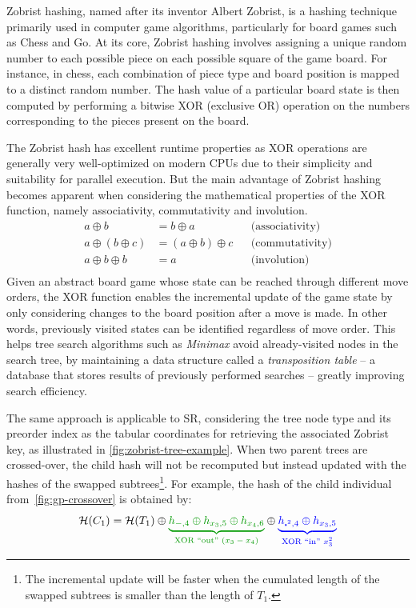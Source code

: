 \documentclass[openacc]{rstransa}%
\begin{document}
Zobrist hashing, named after its inventor Albert Zobrist, is a hashing technique primarily used in computer game algorithms, particularly for board games such as Chess and Go.
%
At its core, Zobrist hashing involves assigning a unique random number to each possible piece on each possible square of the game board. For instance, in chess, each combination of piece type and board position is mapped to a distinct random number. The hash value of a particular board state is then computed by performing a bitwise XOR (exclusive OR) operation on the numbers corresponding to the pieces present on the board.

The Zobrist hash has excellent runtime properties as XOR operations are generally very well-optimized on modern CPUs due to their simplicity and suitability for parallel execution. But the main advantage of Zobrist hashing becomes apparent when considering the mathematical properties of the XOR function, namely associativity, commutativity and involution.
\begin{align*}
    a \oplus b &= b \oplus a & & \text{(associativity)}\\
    a \oplus (b \oplus c) &= (a \oplus b) \oplus c & & \text{(commutativity)}\\
    a \oplus b \oplus b &= a & & \text{(involution)}\\
\end{align*}
Given an abstract board game whose state can be reached through different move orders, the XOR function enables the incremental update of the game state by only considering changes to the board position after a move is made. In other words, previously visited states can be identified regardless of move order. This helps tree search algorithms such as \emph{Minimax} avoid already-visited nodes in the search tree, by maintaining a data structure called a \emph{transposition table} -- a database that stores results of previously performed searches -- greatly improving search efficiency.

The same approach is applicable to SR, considering the tree node type and its preorder index as the tabular coordinates for retrieving the associated Zobrist key, as illustrated in \autoref{fig:zobrist-tree-example}. When two parent trees are crossed-over, the child hash will not be recomputed but instead updated with the hashes of the swapped subtrees\footnote{The incremental update will be faster when the cumulated length of the swapped subtrees is smaller than the length of $T_1$.}. For example, the hash of the child individual from~\autoref{fig:gp-crossover} is obtained by:
\[
    \mathcal{H}(C_1) = \mathcal{H}(T_1) \oplus {\color{green!60!black}\underbrace{h_{-,4} \oplus h_{x_3,5} \oplus h_{x_4, 6}}_{\text{XOR ``out'' $(x_3 - x_4)$}}} \oplus {\color{blue} \underbrace{h_{\centerdot^2,4} \oplus  h_{x_3, 5}}_{\text{XOR ``in'' $x_3^2$}}}
\]
\end{document}
